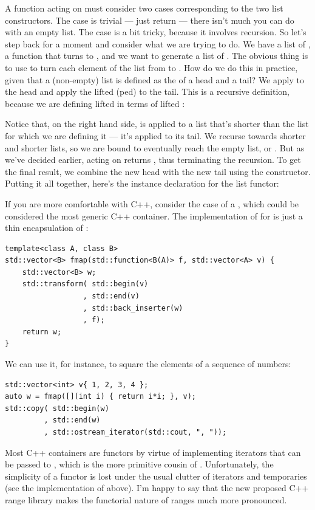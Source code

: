 A function acting on  must consider two cases
corresponding to the two list constructors. The  case is
trivial --- just return  --- there isn't much you can do
with an empty list. The  case is a bit tricky, because it
involves recursion. So let's step back for a moment and consider what we
are trying to do. We have a list of , a function 
that turns  to , and we want to generate a list of
. The obvious thing is to use  to turn each element
of the list from  to . How do we do this in
practice, given that a (non-empty) list is defined as the 
of a head and a tail? We apply  to the head and apply the
lifted (ped)  to the tail. This is a recursive
definition, because we are defining lifted  in terms of lifted
:

Notice that, on the right hand side,  is applied to a
list that's shorter than the list for which we are defining it --- it's
applied to its tail. We recurse towards shorter and shorter lists, so we
are bound to eventually reach the empty list, or . But as
we've decided earlier,  acting on  returns
, thus terminating the recursion. To get the final result,
we combine the new head  with the new tail
 using the  constructor. Putting it
all together, here's the instance declaration for the list functor:

If you are more comfortable with C++, consider the case of a
, which could be considered the most generic C++
container. The implementation of  for 
is just a thin encapsulation of :

\begin{Verbatim}
template<class A, class B>
std::vector<B> fmap(std::function<B(A)> f, std::vector<A> v) {
    std::vector<B> w;
    std::transform( std::begin(v)
                  , std::end(v)
                  , std::back_inserter(w)
                  , f); 
    return w;
}
\end{Verbatim}
We can use it, for instance, to square the elements of a sequence of
numbers:

\begin{Verbatim}
std::vector<int> v{ 1, 2, 3, 4 };
auto w = fmap([](int i) { return i*i; }, v);
std::copy( std::begin(w)
         , std::end(w)
         , std::ostream_iterator(std::cout, ", "));
\end{Verbatim}
Most C++ containers are functors by virtue of implementing iterators
that can be passed to , which is the more
primitive cousin of . Unfortunately, the simplicity of a
functor is lost under the usual clutter of iterators and temporaries
(see the implementation of  above). I'm happy to say that
the new proposed C++ range library makes the functorial nature of ranges
much more pronounced.

